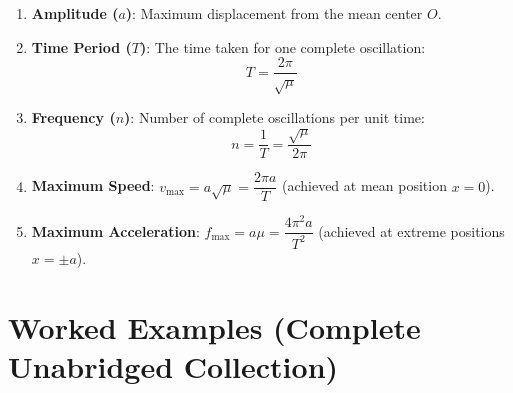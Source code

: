 \begin{keybox}
\begin{enumerate}[leftmargin=1.5em]
    \item \textbf{Amplitude ($a$)}: Maximum displacement from the mean center $O$.
    \item \textbf{Time Period ($T$)}: The time taken for one complete oscillation:
    \begin{equation}
        T = \frac{2\pi}{\sqrt{\mu}}
    \end{equation}
    \item \textbf{Frequency ($n$)}: Number of complete oscillations per unit time:
    \begin{equation}
        n = \frac{1}{T} = \frac{\sqrt{\mu}}{2\pi}
    \end{equation}
    \item \textbf{Maximum Speed}: $v_{\max} = a \sqrt{\mu} = \dfrac{2\pi a}{T}$ (achieved at mean position $x=0$).
    \item \textbf{Maximum Acceleration}: $f_{\max} = a \mu = \dfrac{4\pi^2 a}{T^2}$ (achieved at extreme positions $x = \pm a$).
\end{enumerate}
\end{keybox}

\section{Worked Examples (Complete Unabridged Collection)}


